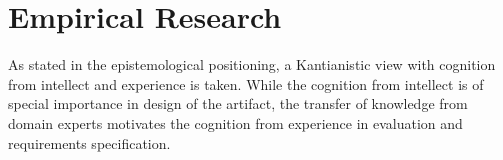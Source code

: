%
%	
%
%
%
%
%		
		
		
	
\section{Empirical Research}
	As stated in the epistemological positioning, a Kantianistic view with cognition from intellect and experience is taken. While the cognition from intellect is of special importance in design of the artifact, the transfer of knowledge from domain experts motivates the cognition from experience in evaluation and requirements specification. 
	

